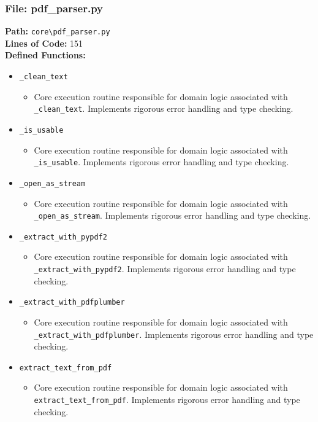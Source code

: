 \documentclass[10pt,journal,compsoc]{IEEEtran}
\begin{document}
\subsubsection{File: pdf\_parser.py}
\textbf{Path:} \texttt{core\textbackslash{}pdf\_parser.py} \\
\textbf{Lines of Code:} 151 \\
\textbf{Defined Functions:}
\begin{itemize}
    \item \texttt{\_clean\_text}
    \begin{itemize} \item Core execution routine responsible for domain logic associated with \texttt{\_clean\_text}. Implements rigorous error handling and type checking. \end{itemize}
    \item \texttt{\_is\_usable}
    \begin{itemize} \item Core execution routine responsible for domain logic associated with \texttt{\_is\_usable}. Implements rigorous error handling and type checking. \end{itemize}
    \item \texttt{\_open\_as\_stream}
    \begin{itemize} \item Core execution routine responsible for domain logic associated with \texttt{\_open\_as\_stream}. Implements rigorous error handling and type checking. \end{itemize}
    \item \texttt{\_extract\_with\_pypdf2}
    \begin{itemize} \item Core execution routine responsible for domain logic associated with \texttt{\_extract\_with\_pypdf2}. Implements rigorous error handling and type checking. \end{itemize}
    \item \texttt{\_extract\_with\_pdfplumber}
    \begin{itemize} \item Core execution routine responsible for domain logic associated with \texttt{\_extract\_with\_pdfplumber}. Implements rigorous error handling and type checking. \end{itemize}
    \item \texttt{extract\_text\_from\_pdf}
    \begin{itemize} \item Core execution routine responsible for domain logic associated with \texttt{extract\_text\_from\_pdf}. Implements rigorous error handling and type checking. \end{itemize}
\end{itemize}
\end{document}
